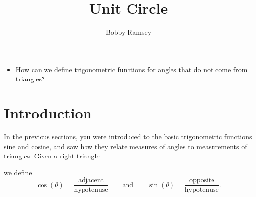 \documentclass[nooutcomes]{ximera}
\author{Bobby Ramsey}
\title{Unit Circle}
\begin{document}
\begin{abstract}
	
\end{abstract}
\maketitle



\begin{motivatingQuestions}\begin{itemize}
	\item How can we define trigonometric functions for angles that do not come from triangles?
\end{itemize}\end{motivatingQuestions}

\section{Introduction}

In the previous sections, you were introduced to the basic trigonometric functions sine and cosine, and saw how they relate measures of angles to
measurements of triangles. Given a right triangle
\begin{image}[2in]
\end{image}
we define
\[
\cos(\theta) =
\frac{\text{adjacent}}{\text{hypotenuse}}\qquad\text{and}\qquad\sin(\theta)
= \frac{\text{opposite}}{\text{hypotenuse}}.
\]
\end{document}

